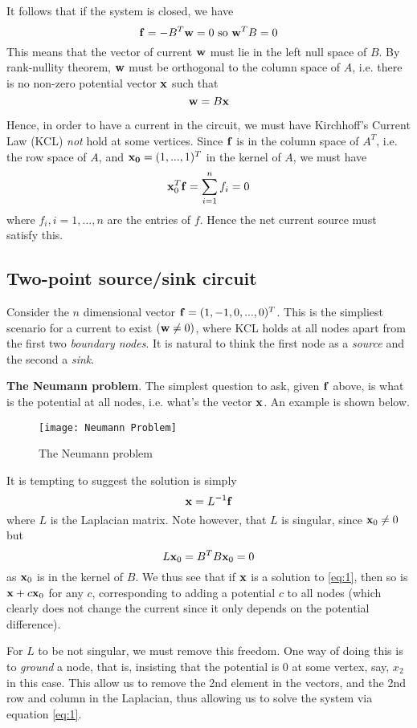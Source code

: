 \documentclass[11pt]{article}
\begin{document}
It follows that if the system is closed, we have
\[\bf{f}=-B^T\bf{w}=0 \text{ so } \bf{w}^TB=0\]
This means that the vector of current \(\bf{w}\) must lie in the left null space of \(B\). By rank-nullity theorem, \(\bf{w}\) must be orthogonal to the column space of \(A\), i.e. there is no non-zero potential vector \(\bf{x}\) such that \[\bf{w}=B\bf{x}\]

Hence, in order to have a current in the circuit, we must have Kirchhoff's Current Law (KCL) \emph{not} hold at some vertices. Since \(\bf{f}\) is in the column space of \(A^T\), i.e. the row space of \(A\), and \(\bf{x_0}=(1,...,1)^T\) in the kernel of \(A\), we must have
\[\bf{x}_0^T\bf{f}=\sum_{i=1}^{n}f_i=0\]
where \(f_i,i=1,...,n\) are the entries of \(f\). Hence the net current source must satisfy this. 

\subsection{Two-point source/sink circuit}
Consider the \(n\) dimensional vector \(\bf{f}=(1,-1,0,...,0)^T\). This is the simpliest scenario for a current to exist \((\bf{w}\neq 0)\), where KCL holds at all nodes apart from the first two \emph{boundary nodes}. It is natural to think the first node as a \emph{source} and the second a \emph{sink}. 

\vspace{5pt}\textbf{The Neumann problem}.
The simplest question to ask, given \(\bf{f}\) above, is what is the potential at all nodes, i.e. what's the vector \(\bf{x}\). An example is shown below.

\begin{figure}[ht]
  \centering
  \texttt{[image: Neumann Problem]}
  \caption{The Neumann problem}
\end{figure}

It is tempting to suggest the solution is simply
\begin{equation}\label{eq:1}
  \bf{x}=L^{-1}\bf{f}
\end{equation}
where \(L\) is the Laplacian matrix. Note however, that \(L\) is singular, since \(\bf{x}_0\neq 0\) but
\[L\bf{x}_0=B^TB\bf{x}_0=0\]
as \(\bf{x}_0\) is in the kernel of \(B\). We thus see that if \(\bf{x}\) is a solution to \eqref{eq:1}, then so is \(\bf{x}+c\bf{x}_0\) for any \(c\), corresponding to adding a potential \(c\) to all nodes (which clearly does not change the current since it only depends on the potential difference).

For \(L\) to be not singular, we must remove this freedom. One way of doing this is to \emph{ground} a node, that is, insisting that the potential is 0 at some vertex, say, \(x_2\) in this case. This allow us to remove the 2nd element in the vectors, and the 2nd row and column in the Laplacian, thus allowing us to solve the system via equation \eqref{eq:1}.
\end{document}
